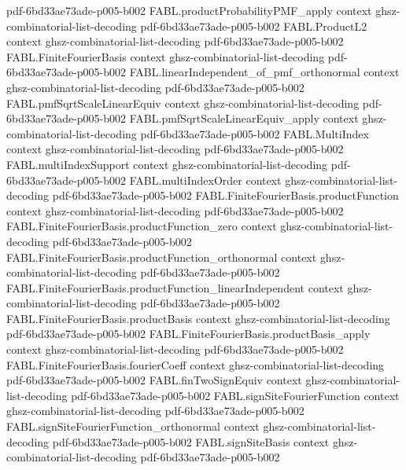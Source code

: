\begin{theorem}
  {pdf-6bd33ae73ade-p005-b002}
\proofstep
  {FABL.productProbabilityPMF_apply}
  {context}
  {ghsz-combinatorial-list-decoding}
  {pdf-6bd33ae73ade-p005-b002}
\proofstep
  {FABL.ProductL2}
  {context}
  {ghsz-combinatorial-list-decoding}
  {pdf-6bd33ae73ade-p005-b002}
\proofstep
  {FABL.FiniteFourierBasis}
  {context}
  {ghsz-combinatorial-list-decoding}
  {pdf-6bd33ae73ade-p005-b002}
\proofstep
  {FABL.linearIndependent_of_pmf_orthonormal}
  {context}
  {ghsz-combinatorial-list-decoding}
  {pdf-6bd33ae73ade-p005-b002}
\proofstep
  {FABL.pmfSqrtScaleLinearEquiv}
  {context}
  {ghsz-combinatorial-list-decoding}
  {pdf-6bd33ae73ade-p005-b002}
\proofstep
  {FABL.pmfSqrtScaleLinearEquiv_apply}
  {context}
  {ghsz-combinatorial-list-decoding}
  {pdf-6bd33ae73ade-p005-b002}
\proofstep
  {FABL.MultiIndex}
  {context}
  {ghsz-combinatorial-list-decoding}
  {pdf-6bd33ae73ade-p005-b002}
\proofstep
  {FABL.multiIndexSupport}
  {context}
  {ghsz-combinatorial-list-decoding}
  {pdf-6bd33ae73ade-p005-b002}
\proofstep
  {FABL.multiIndexOrder}
  {context}
  {ghsz-combinatorial-list-decoding}
  {pdf-6bd33ae73ade-p005-b002}
\proofstep
  {FABL.FiniteFourierBasis.productFunction}
  {context}
  {ghsz-combinatorial-list-decoding}
  {pdf-6bd33ae73ade-p005-b002}
\proofstep
  {FABL.FiniteFourierBasis.productFunction_zero}
  {context}
  {ghsz-combinatorial-list-decoding}
  {pdf-6bd33ae73ade-p005-b002}
\proofstep
  {FABL.FiniteFourierBasis.productFunction_orthonormal}
  {context}
  {ghsz-combinatorial-list-decoding}
  {pdf-6bd33ae73ade-p005-b002}
\proofstep
  {FABL.FiniteFourierBasis.productFunction_linearIndependent}
  {context}
  {ghsz-combinatorial-list-decoding}
  {pdf-6bd33ae73ade-p005-b002}
\proofstep
  {FABL.FiniteFourierBasis.productBasis}
  {context}
  {ghsz-combinatorial-list-decoding}
  {pdf-6bd33ae73ade-p005-b002}
\proofstep
  {FABL.FiniteFourierBasis.productBasis_apply}
  {context}
  {ghsz-combinatorial-list-decoding}
  {pdf-6bd33ae73ade-p005-b002}
\proofstep
  {FABL.FiniteFourierBasis.fourierCoeff}
  {context}
  {ghsz-combinatorial-list-decoding}
  {pdf-6bd33ae73ade-p005-b002}
\proofstep
  {FABL.finTwoSignEquiv}
  {context}
  {ghsz-combinatorial-list-decoding}
  {pdf-6bd33ae73ade-p005-b002}
\proofstep
  {FABL.signSiteFourierFunction}
  {context}
  {ghsz-combinatorial-list-decoding}
  {pdf-6bd33ae73ade-p005-b002}
\proofstep
  {FABL.signSiteFourierFunction_orthonormal}
  {context}
  {ghsz-combinatorial-list-decoding}
  {pdf-6bd33ae73ade-p005-b002}
\proofstep
  {FABL.signSiteBasis}
  {context}
  {ghsz-combinatorial-list-decoding}
  {pdf-6bd33ae73ade-p005-b002}
\proofstep

\end{theorem}

